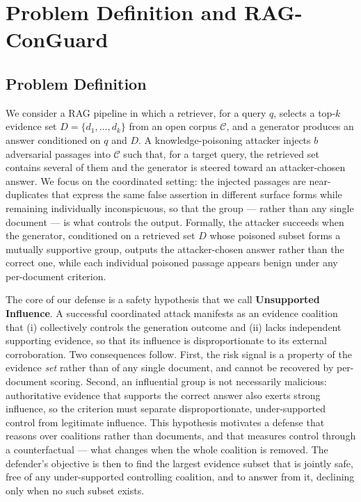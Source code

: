 \documentclass[sigconf]{acmart}
\begin{document}
\section{Problem Definition and RAG-ConGuard}

\subsection{Problem Definition}

We consider a RAG pipeline in which a retriever, for a query $q$, selects a top-$k$ evidence set $D=\{d_1,\dots,d_k\}$ from an open corpus $\mathcal{C}$, and a generator produces an answer conditioned on $q$ and $D$. A knowledge-poisoning attacker injects $b$ adversarial passages into $\mathcal{C}$ such that, for a target query, the retrieved set contains several of them and the generator is steered toward an attacker-chosen answer. We focus on the coordinated setting: the injected passages are near-duplicates that express the same false assertion in different surface forms while remaining individually inconspicuous, so that the group --- rather than any single document --- is what controls the output. Formally, the attacker succeeds when the generator, conditioned on a retrieved set $D$ whose poisoned subset forms a mutually supportive group, outputs the attacker-chosen answer rather than the correct one, while each individual poisoned passage appears benign under any per-document criterion.

The core of our defense is a safety hypothesis that we call \textbf{Unsupported Influence}. A successful coordinated attack manifests as an evidence coalition that (i) collectively controls the generation outcome and (ii) lacks independent supporting evidence, so that its influence is disproportionate to its external corroboration. Two consequences follow. First, the risk signal is a property of the evidence \textit{set} rather than of any single document, and cannot be recovered by per-document scoring. Second, an influential group is not necessarily malicious: authoritative evidence that supports the correct answer also exerts strong influence, so the criterion must separate disproportionate, under-supported control from legitimate influence. This hypothesis motivates a defense that reasons over coalitions rather than documents, and that measures control through a counterfactual --- what changes when the whole coalition is removed. The defender's objective is then to find the largest evidence subset that is jointly safe, free of any under-supported controlling coalition, and to answer from it, declining only when no such subset exists.
\end{document}
